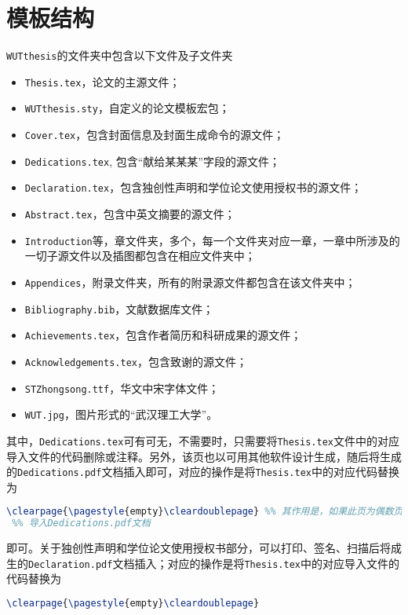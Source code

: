\section{模板结构}


\par \texttt{WUTthesis}的文件夹中包含以下文件及子文件夹
\begin{itemize}
\item \texttt{Thesis.tex}，论文的主源文件；
\item \texttt{WUTthesis.sty}，自定义的论文模板宏包；
\item \texttt{Cover.tex}，包含封面信息及封面生成命令的源文件；
\item \texttt{Dedications.tex}, 包含“{\kaishu 献给某某某}”字段的源文件；
\item \texttt{Declaration.tex}，包含独创性声明和学位论文使用授权书的源文件；
\item \texttt{Abstract.tex}，包含中英文摘要的源文件；
\item \texttt{Introduction}等，章文件夹，多个，每一个文件夹对应一章，一章中所涉及的一切子源文件以及插图都包含在相应文件夹中；
\item \texttt{Appendices}，附录文件夹，所有的附录源文件都包含在该文件夹中；
\item \texttt{Bibliography.bib}，文献数据库文件；
\item \texttt{Achievements.tex}，包含作者简历和科研成果的源文件；
\item \texttt{Acknowledgements.tex}，包含致谢的源文件；
\item \texttt{STZhongsong.ttf}，华文中宋字体文件；
\item \texttt{WUT.jpg}，图片形式的“武汉理工大学”。
\end{itemize}
其中，\texttt{Dedications.tex}可有可无，不需要时，只需要将\texttt{Thesis.tex}文件中的对应导入文件的代码删除或注释。另外，该页也以可用其他软件设计生成，随后将生成的\texttt{Dedications.pdf}文档插入即可，对应的操作是将\texttt{Thesis.tex}中的对应代码替换为
\begin{lstlisting}[language=TeX]
\clearpage{\pagestyle{empty}\cleardoublepage} %% 其作用是，如果此页为偶数页，则设为完全空白页，进入下一页
 %% 导入Dedications.pdf文档
\end{lstlisting}
即可。关于{\STZhongsong 独创性声明}和{\STZhongsong 学位论文使用授权书}部分，可以打印、签名、扫描后将成生的\texttt{Declaration.pdf}文档插入；对应的操作是将\texttt{Thesis.tex}中的对应导入文件的代码替换为
\begin{lstlisting}[language=TeX]
\clearpage{\pagestyle{empty}\cleardoublepage}

\end{lstlisting}
